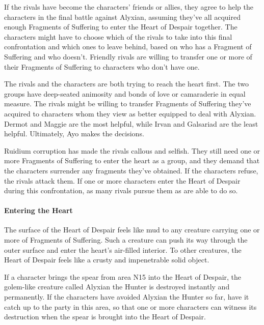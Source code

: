 \documentclass[10pt,a4paper,twoside,twocolumn,openany,nodeprecatedcode]{dndbook}
\begin{document}
\begin{description}[nolistsep]
\item[Friendly Rivals.]
If the rivals have become the characters' friends or allies, they agree to help the characters in the final battle against Alyxian, assuming they've all acquired enough Fragments of Suffering to enter the Heart of Despair together. The characters might have to choose which of the rivals to take into this final confrontation and which ones to leave behind, based on who has a Fragment of Suffering and who doesn't. Friendly rivals are willing to transfer one or more of their Fragments of Suffering to characters who don't have one.
\item[Indifferent Rivals.]
The rivals and the characters are both trying to reach the heart first. The two groups have deep-seated animosity and bonds of love or camaraderie in equal measure. The rivals might be willing to transfer Fragments of Suffering they've acquired to characters whom they view as better equipped to deal with Alyxian. Dermot and Maggie are the most helpful, while Irvan and Galsariad are the least helpful. Ultimately, Ayo makes the decisions.
\item[Hostile Rivals.]
Ruidium corruption has made the rivals callous and selfish. They still need one or more Fragments of Suffering to enter the heart as a group, and they demand that the characters surrender any fragments they've obtained. If the characters refuse, the rivals attack them. If one or more characters enter the Heart of Despair during this confrontation, as many rivals pursue them as are able to do so.
\end{description}

\paragraph{Entering the Heart}
The surface of the Heart of Despair feels like mud to any creature carrying one or more of Fragments of Suffering. Such a creature can push its way through the outer surface and enter the heart's air-filled interior. To other creatures, the Heart of Despair feels like a crusty and impenetrable solid object.

If a character brings the spear from area N15 into the Heart of Despair, the golem-like creature called Alyxian the Hunter is destroyed instantly and permanently. If the characters have avoided Alyxian the Hunter so far, have it catch up to the party in this area, so that one or more characters can witness its destruction when the spear is brought into the Heart of Despair.
\end{document}
